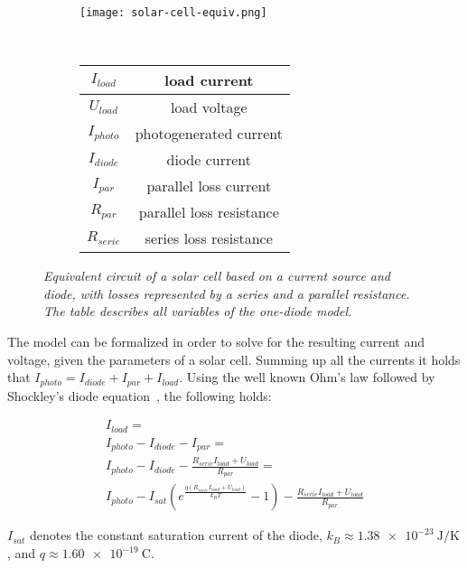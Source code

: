 \begin{figure}[!ht]
\centering
\begin{subfigure}{0.4\textwidth}
  \texttt{[image: solar-cell-equiv.png]}
\end{subfigure}
~
\begin{subfigure}{0.4\textwidth}
  \begin{tabular}[b]{| c | c |}
  \hline
  $I_{load}$ & load current \\ \hline
  $U_{load}$ & load voltage\\ \hline
  $I_{photo}$ & photogenerated current \\ \hline
  $I_{diode}$ & diode current \\ \hline
  $I_{par}$ & parallel loss current \\ \hline
  $R_{par}$ & parallel loss resistance \\ \hline
  $R_{serie}$ & series loss resistance \\ \hline
  \end{tabular}
\end{subfigure}
  \caption[Equivalent circuit of a solar cell]{
    \emph{
    Equivalent circuit of a solar cell based on a current source and diode,
    with losses represented by a series and a parallel resistance.
    The table describes all variables of the one-diode model.
    }
  }
  \label{fig:solar-cell-equiv}
\end{figure}

\clearpage
The model can be formalized in order to solve for the resulting current and voltage, given the parameters of a solar cell.
Summing up all the currents it holds that $I_{photo} = I_{diode} + I_{par} + I_{load}$.
Using the well known Ohm's law followed by Shockley's diode equation~\cite{Walker2001}, the following holds:

\begin{multline}
\label{eq:eq-circuit}
I_{load} = \\
I_{photo} - I_{diode} - I_{par} = \\
I_{photo} - I_{diode} - \frac{R_{serie}I_{load} + U_{load}}{R_{par}} = \\
I_{photo} - I_{sat}(e^\frac{q(R_{serie}I_{load} + U_{load})}{k_B T} - 1) - \frac{R_{serie}I_{load} + U_{load}}{R_{par}}
\end{multline}

$I_{sat}$ denotes the constant saturation current of the diode,
$k_B \approx \SI{1.38e-23}{\joule\per\kelvin}$,
and $q \approx \SI{1.60e-19}{\coulomb}$.

